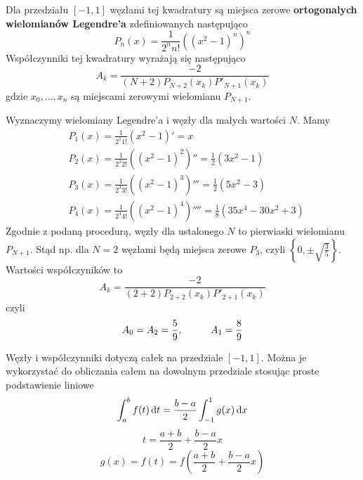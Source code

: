 \documentclass[../mn-notatki.tex]{subfiles}
\begin{document}
Dla przedziału $[-1,1]$ węzłami tej kwadratury są miejsca zerowe
\textbf{ortogonalych wielomianów Legendre'a} zdefiniowanych następująco
\[
P_n(x) = \frac{1}{2^n n!} \left((x^2-1)^n\right)^n
\]
Współczynniki tej kwadratury wyrażają się następująco
\[
A_k = \frac{-2}{(N+2)P_{N+2}(x_k)P'_{N+1}(x_k)}
\]
gdzie $x_0, \ldots, x_n$ są miejscami zerowymi wielomianu $P_{N+1}$.

Wyznaczymy wielomiany Legendre'a i węzły dla małych wartości $N$. Mamy
\begin{align*}
&P_1(x) = \frac{1}{2^1 1!} \left( x^2 - 1 \right)' = x \\
&P_2(x) = \frac{1}{2^2 2!} \left( (x^2 - 1)^2 \right)'' = \frac{1}{2}\left(3x^2 -1 \right)\\
&P_3(x) = \frac{1}{2^3 3!} \left( (x^2 - 1)^3 \right)''' = \frac{1}{2}\left(5x^2 -3 \right)\\
&P_4(x) = \frac{1}{2^4 4!} \left( (x^2 - 1)^4 \right)'''' = \frac{1}{8}\left(35x^4 -30x^2 + 3 \right)
\end{align*}
Zgodnie z podaną procedurą, węzły dla ustalonego $N$ to pierwiaski wielomianu
$P_{N+1}$. Stąd np. dla $N=2$ węzłami będą miejsca zerowe $P_3$, czyli
$\left\{ 0, \pm \sqrt{\frac{3}{5}} \right\}$. Wartości współczyników to
\[
A_k = \frac{-2}{(2+2)P_{2+2}(x_k)P'_{2+1}(x_k)}
\]
czyli
\[
A_0 = A_2 = \frac{5}{9}, \hspace*{1cm} A_1 = \frac{8}{9}
\]

Węzły i współczynniki dotyczą całek na przedziale $[-1,1]$. Można je wykorzystać
do obliczania całem na dowolnym przedziale stosując proste podstawienie
liniowe
\[
\int_a^b f(t) \dif t = \frac{b-a}{2} \int_{-1}^1 g(x) \dif x
\]
\[
t = \frac{a+b}{2} + \frac{b-a}{2}x
\]
\[
g(x) = f(t) = f \left(\frac{a+b}{2} + \frac{b-a}{2}x \right)
\]


\pagebreak
\end{document}
